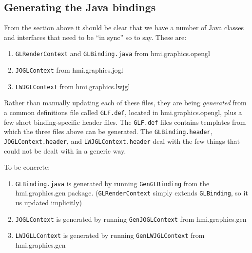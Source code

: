  \subsection{Generating the Java bindings}
 From the section above it should be clear that we have a number of Java classes and interfaces that need to be ``in sync'' so to say. These are:
 \begin{enumerate}
 \item \verb"GLRenderContext" and \verb"GLBinding.java" from hmi.graphics.opengl
 \item \verb"JOGLContext" from hmi.graphics.jogl
 \item \verb"LWJGLContext" from hmi.graphics.lwjgl
 \end{enumerate} 
 Rather than manually updating each of these files, they are being \emph{generated} from a common definitions file called \verb"GLF.def", located in hmi.graphics.opengl, plus a few short binding-specific header files. The \verb"GLF.def" files contains templates from which the three files above can be generated. The \verb"GLBinding.header", \verb"JOGLContext.header", and \verb"LWJGLContext.header" deal with the few things that could not be dealt with in a generic way.
 
 To be concrete:
 \begin{enumerate}
 \item \verb"GLBinding.java" is generated by running \verb"GenGLBinding" from the hmi.graphics.gen package.
 (\verb"GLRenderContext" simply extends \verb"GLBinding", so it us updated implicitly)
 \item \verb"JOGLContext" is generated by running \verb"GenJOGLContext" from hmi.graphics.gen
 \item \verb"LWJGLLContext" is generated by running \verb"GenLWJGLContext" from hmi.graphics.gen
 \end{enumerate}
 
